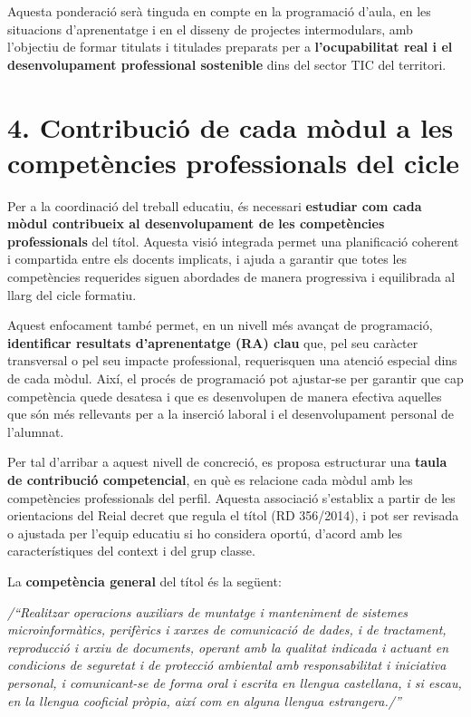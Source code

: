 \documentclass[
  paper=a4,
  ,captions=tableheading
]{scrartcl}
\renewenvironment{quote}{\begin{customblockquote}\list{}{\rightmargin=0em\leftmargin=0em}%
\item\relax\color{blockquote-text}\ignorespaces}{\unskip\unskip\endlist\end{customblockquote}}
\begin{document}
Aquesta ponderació serà tinguda en compte en la programació d'aula, en
les situacions d'aprenentatge i en el disseny de projectes
intermodulars, amb l'objectiu de formar titulats i titulades preparats
per a \textbf{l'ocupabilitat real i el desenvolupament professional
sostenible} dins del sector TIC del territori.

\hypertarget{contribuciuxf3-de-cada-muxf2dul-a-les-competuxe8ncies-professionals-del-cicle}{%
\section{4. Contribució de cada mòdul a les competències professionals
del
cicle}\label{contribuciuxf3-de-cada-muxf2dul-a-les-competuxe8ncies-professionals-del-cicle}}

Per a la coordinació del treball educatiu, és necessari \textbf{estudiar
com cada mòdul contribueix al desenvolupament de les competències
professionals} del títol. Aquesta visió integrada permet una
planificació coherent i compartida entre els docents implicats, i ajuda
a garantir que totes les competències requerides siguen abordades de
manera progressiva i equilibrada al llarg del cicle formatiu.

Aquest enfocament també permet, en un nivell més avançat de programació,
\textbf{identificar resultats d'aprenentatge (RA) clau} que, pel seu
caràcter transversal o pel seu impacte professional, requerisquen una
atenció especial dins de cada mòdul. Així, el procés de programació pot
ajustar-se per garantir que cap competència quede desatesa i que es
desenvolupen de manera efectiva aquelles que són més rellevants per a la
inserció laboral i el desenvolupament personal de l'alumnat.

Per tal d'arribar a aquest nivell de concreció, es proposa estructurar
una \textbf{taula de contribució competencial}, en què es relacione cada
mòdul amb les competències professionals del perfil. Aquesta associació
s'establix a partir de les orientacions del Reial decret que regula el
títol (RD 356/2014), i pot ser revisada o ajustada per l'equip educatiu
si ho considera oportú, d'acord amb les característiques del context i
del grup classe.

La \textbf{competència general} del títol és la següent:

\begin{quote}
\emph{/``Realitzar operacions auxiliars de muntatge i manteniment de
sistemes microinformàtics, perifèrics i xarxes de comunicació de dades,
i de tractament, reproducció i arxiu de documents, operant amb la
qualitat indicada i actuant en condicions de seguretat i de protecció
ambiental amb responsabilitat i iniciativa personal, i comunicant-se de
forma oral i escrita en llengua castellana, i si escau, en la llengua
cooficial pròpia, així com en alguna llengua estrangera./''}
\end{quote}
\end{document}
